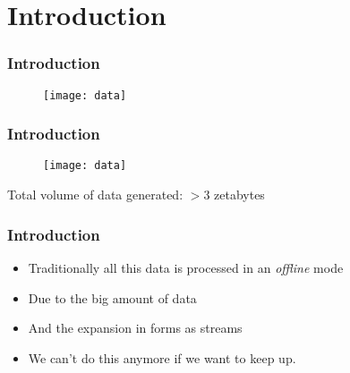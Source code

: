 \section{Introduction}


\begin{frame}
\frametitle{Introduction}

\begin{figure}
\centering
\texttt{[image: data]}
\end{figure}

\end{frame}


\begin{frame}
\frametitle{Introduction}

\begin{figure}
\centering
\texttt{[image: data]}
\end{figure}

\LARGE Total volume of data generated: $>3$ zetabytes

\end{frame}



\begin{frame}
\frametitle{Introduction}
\begin{itemize}
\item<1-5> Traditionally all this data is processed in an \textit{offline} mode
\item<2-4> Due to the big amount of data
\item<2-4> And the expansion in forms as streams
\item<3-4> We can't do this anymore if we want to keep up.


\end{itemize}


\end{frame}
